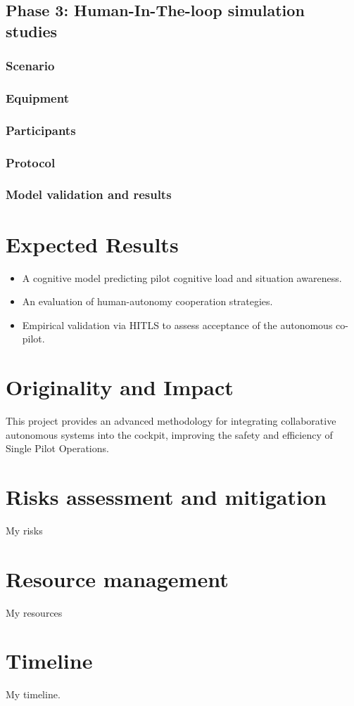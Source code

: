 \documentclass[12pt,a4paper]{article} %
\begin{document}
	\subsection{Phase 3: Human-In-The-loop simulation studies}
	\subsubsection{Scenario}
	\subsubsection{Equipment}
	\subsubsection{Participants}
	\subsubsection{Protocol}
	\subsubsection{Model validation and results}
	
	\section{Expected Results} %
	\begin{itemize}
		\item A cognitive model predicting pilot cognitive load and situation awareness.
		\item An evaluation of human-autonomy cooperation strategies.
		\item Empirical validation via HITLS to assess acceptance of the autonomous co-pilot.
	\end{itemize} %
	
	\section{Originality and Impact} %
	This project provides an advanced methodology for integrating collaborative autonomous systems into the cockpit, improving the safety and efficiency of Single Pilot Operations.
	
	\section{Risks assessment and mitigation}
	My risks
	
	\section{Resource management}
	My resources
	
	\section{Timeline}
	My timeline.
	\printbibliography %
	
\end{document}
